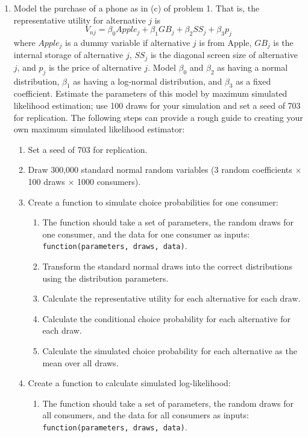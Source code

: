 \documentclass[11pt,letterpaper]{article}\usepackage[]{graphicx}\usepackage[]{color}
\begin{document}
\begin{enumerate}[label=\alph*., leftmargin=*]
	\item Model the purchase of a phone as in (c) of problem 1. That is, the representative utility for alternative $j$ is
	$$V_{nj} = \beta_0 Apple_j + \beta_1 GB_j + \beta_2 SS_j + \beta_3 p_j$$
	where $Apple_j$ is a dummy variable if alternative $j$ is from Apple, $GB_j$ is the internal storage of alternative $j$, $SS_j$ is the diagonal screen size of alternative $j$, and $p_j$ is the price of alternative $j$. Model $\beta_0$ and $\beta_2$ as having a normal distribution, $\beta_1$ as having a log-normal distribution, and $\beta_3$ as a fixed coefficient. Estimate the parameters of this model by maximum simulated likelihood estimation; use 100 draws for your simulation and set a seed of 703 for replication. The following steps can provide a rough guide to creating your own maximum simulated likelihood estimator:
	\begin{enumerate}[label=\Roman*.]
		\item Set a seed of 703 for replication.
		\item Draw 300,000 standard normal random variables (3 random coefficients $\times$ 100 draws $\times$ 1000 consumers).
		\item Create a function to simulate choice probabilities for one consumer:
		\begin{enumerate}[label=\roman*.]
			\item The function should take a set of parameters, the random draws for one consumer, and the data for one consumer as inputs: \texttt{function(parameters, draws, data)}.
			\item Transform the standard normal draws into the correct distributions using the distribution parameters.
			\item Calculate the representative utility for each alternative for each draw.
			\item Calculate the conditional choice probability for each alternative for each draw.
			\item Calculate the simulated choice probability for each alternative as the mean over all draws.
		\end{enumerate}
		\item Create a function to calculate simulated log-likelihood:
		\begin{enumerate}[label=\roman*.]
			\item The function should take a set of parameters, the random draws for all consumers, and the data for all consumers as inputs: \texttt{function(parameters, draws, data)}.

\end{enumerate}
\end{enumerate}
\end{enumerate}
\end{document}
